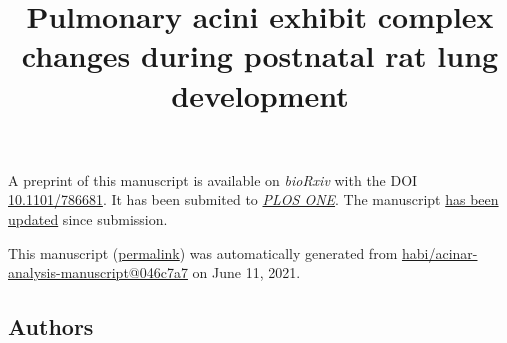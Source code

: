 \documentclass[
  american,
]{article}
\title{Pulmonary acini exhibit complex changes during postnatal rat lung development}
\author{}
\date{}
\begin{document}
\maketitle

A preprint of this manuscript is available on \emph{bioRxiv} with the DOI \href{https://doi.org/10.1101/786681}{10.1101/786681}.
It has been submited to \href{https://journals.plos.org/plosone/}{\emph{PLOS ONE}}.
The manuscript \href{https://github.com/habi/acinar-analysis-manuscript/compare/5e778036e316c47b8bac4ce50086b191a7e3707a...046c7a756fb6953d19e0f14540e7605542b59db9}{has been updated} since submission.

This manuscript
(\href{https://habi.github.io/acinar-analysis-manuscript/v/046c7a756fb6953d19e0f14540e7605542b59db9/}{permalink})
was automatically generated
from \href{https://github.com/habi/acinar-analysis-manuscript/tree/046c7a756fb6953d19e0f14540e7605542b59db9}{habi/acinar-analysis-manuscript@046c7a7}
on June 11, 2021.

\hypertarget{authors}{%
\subsection{Authors}\label{authors}}
\end{document}
